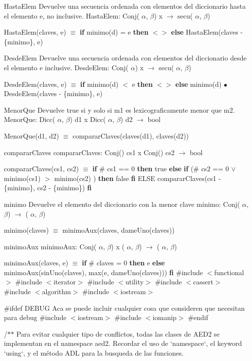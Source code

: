 \begin{DoxyParagraph}{\-Hasta\-Elem}
\-Devuelve una secuencia ordenada con elementos del diccionario hasta el elemento e, no inclusive. \-Hasta\-Elem\-: \-Conj( $\alpha$, $\beta$) x $\to$ secu( $\alpha$, $\beta$)\par
 \-Hasta\-Elem(claves, e) $\equiv$ {\bfseries if} minimo(d) = e {\bfseries then} $<$$>$ {\bfseries else} \-Hasta\-Elem(claves -\/ \{minimo\}, e) 
\end{DoxyParagraph}
\begin{DoxyParagraph}{\-Desde\-Elem}
\-Devuelve una secuencia ordenada con elementos del diccionario desde el elemento e inclusive. \-Desde\-Elem\-: \-Conj( $\alpha$) x $\to$ secu( $\alpha$, $\beta$)\par
 \-Desde\-Elem(claves, e) $\equiv$ {\bfseries if} minimo(d) $<$ e {\bfseries then} $<$$>$ {\bfseries else} minimo(d) $\bullet$ \-Desde\-Elem(claves -\/ \{minimo\}, e) 
\end{DoxyParagraph}
\begin{DoxyParagraph}{\-Menor\-Que}
\-Devuelve true si y solo si m1 es lexicograficamente menor que m2. \-Menor\-Que\-: \-Dicc( $\alpha$, $\beta$) d1 x \-Dicc( $\alpha$, $\beta$) d2 $\to$ bool\par
 \-Menor\-Que(d1, d2) $\equiv$ comparar\-Claves(claves(d1), claves(d2)) 
\end{DoxyParagraph}
\begin{DoxyParagraph}{comparar\-Claves}
comparar\-Claves\-: \-Conj() cs1 x \-Conj() cs2 $\to$ bool\par
 comparar\-Claves(cs1, cs2) $\equiv$ {\bfseries if} \# cs1 == 0 {\bfseries then} true {\bfseries else} {\bfseries if} (\# cs2 == 0 $\lor$ minimo(cs1) $>$ minimo(cs2) ) {\bfseries then} false {\bfseries fi} \-E\-L\-S\-E comparar\-Claves(cs1 -\/ \{minimo\}, cs2 -\/ \{minimo\}) {\bfseries fi} 
\end{DoxyParagraph}
\begin{DoxyParagraph}{minimo}
\-Devuelve el elemento del diccionario con la menor clave minimo\-: \-Conj( $\alpha$, $\beta$) $\to$ ( $\alpha$, $\beta$)\par
 minimo(claves) $\equiv$ minimo\-Aux(claves, dame\-Uno(claves)) 
\end{DoxyParagraph}
\begin{DoxyParagraph}{minimo\-Aux}
mínimo\-Aux\-: \-Conj( $\alpha$, $\beta$) x ( $\alpha$, $\beta$) $\to$ ( $\alpha$, $\beta$)\par
 minimo\-Aux(claves, e) $\equiv$ {\bfseries if} \# claves = 0 {\bfseries then} e {\bfseries else} minimo\-Aux(sin\-Uno(claves), max(e, dame\-Uno(claves))) {\bfseries fi}  \#include $<$functional$>$ \#include $<$iterator$>$ \#include $<$utility$>$ \#include $<$cassert$>$ \#include $<$algorithm$>$ \#include $<$iostream$>$
\end{DoxyParagraph}
\#ifdef \-D\-E\-B\-U\-G \-Aca se puede incluir cualquier cosa que consideren que necesitan para debug \#include $<$iostream$>$ \#include $<$iomanip$>$ \#endif

/$\ast$$\ast$ \-Para evitar cualquier tipo de conflictos, todas las clases de \-A\-E\-D2 se implementan en el namespace aed2. \-Recordar el uso de `namespace`, el keyword `using`, y el método \-A\-D\-L para la busqueda de las funciones. 